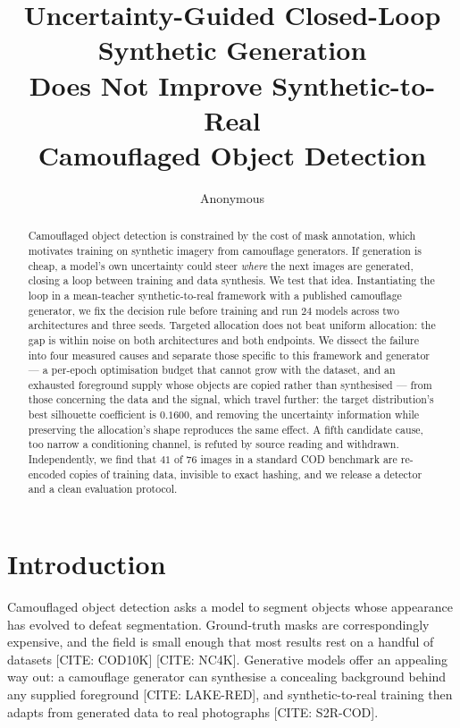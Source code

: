\documentclass{article}
\title{Uncertainty-Guided Closed-Loop Synthetic Generation\\
       Does Not Improve Synthetic-to-Real\\
       Camouflaged Object Detection}
\author{Anonymous}
\begin{document}
\maketitle

\begin{abstract}
Camouflaged object detection is constrained by the cost of mask annotation,
which motivates training on synthetic imagery from camouflage generators. If
generation is cheap, a model's own uncertainty could steer \emph{where} the next
images are generated, closing a loop between training and data synthesis. We
test that idea. Instantiating the loop in a mean-teacher synthetic-to-real
framework with a published camouflage generator, we fix the decision rule before
training and run $24$ models across two architectures and three seeds. Targeted
allocation does not beat uniform allocation: the gap is within noise on both
architectures and both endpoints. We dissect the failure into four measured
causes and separate those specific to this framework and generator --- a
per-epoch optimisation budget that cannot grow with the dataset, and an
exhausted foreground supply whose objects are copied rather than synthesised ---
from those concerning the data and the signal, which travel further: the target
distribution's best silhouette coefficient is $0.1600$, and removing the
uncertainty information while preserving the allocation's shape reproduces the
same effect. A fifth candidate cause, too narrow a conditioning channel, is
refuted by source reading and withdrawn. Independently, we find that $41$ of
$76$ images in a standard COD
benchmark are re-encoded copies of training data, invisible to exact hashing,
and we release a detector and a clean evaluation protocol.
\end{abstract}

\section{Introduction}
\label{sec:intro}

Camouflaged object detection asks a model to segment objects whose appearance
has evolved to defeat segmentation. Ground-truth masks are correspondingly
expensive, and the field is small enough that most results rest on a handful of
datasets [CITE: COD10K] [CITE: NC4K]. Generative models offer an appealing way
out: a camouflage generator can synthesise a concealing background behind any
supplied foreground [CITE: LAKE-RED], and synthetic-to-real training then adapts
from generated data to real photographs [CITE: S2R-COD].
\end{document}
